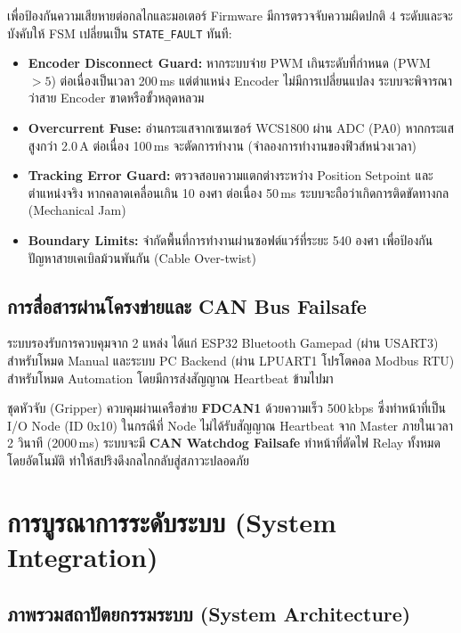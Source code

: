 เพื่อป้องกันความเสียหายต่อกลไกและมอเตอร์ Firmware มีการตรวจจับความผิดปกติ 4 ระดับและจะบังคับให้ FSM เปลี่ยนเป็น \texttt{STATE\_FAULT} ทันที:
\begin{itemize}
    \item \textbf{Encoder Disconnect Guard:} หากระบบจ่าย PWM เกินระดับที่กำหนด (PWM $> 5$) ต่อเนื่องเป็นเวลา 200\,ms แต่ตำแหน่ง Encoder ไม่มีการเปลี่ยนแปลง ระบบจะพิจารณาว่าสาย Encoder ขาดหรือขั้วหลุดหลวม
    \item \textbf{Overcurrent Fuse:} อ่านกระแสจากเซนเซอร์ WCS1800 ผ่าน ADC (PA0) หากกระแสสูงกว่า 2.0\,A ต่อเนื่อง 100\,ms จะตัดการทำงาน (จำลองการทำงานของฟิวส์หน่วงเวลา)
    \item \textbf{Tracking Error Guard:} ตรวจสอบความแตกต่างระหว่าง Position Setpoint และตำแหน่งจริง หากคลาดเคลื่อนเกิน 10 องศา ต่อเนื่อง 50\,ms ระบบจะถือว่าเกิดการติดขัดทางกล (Mechanical Jam)
    \item \textbf{Boundary Limits:} จำกัดพื้นที่การทำงานผ่านซอฟต์แวร์ที่ระยะ 540 องศา เพื่อป้องกันปัญหาสายเคเบิลม้วนพันกัน (Cable Over-twist)
\end{itemize}

\subsection{การสื่อสารผ่านโครงข่ายและ CAN Bus Failsafe}
\label{subsec:comms_canbus}

ระบบรองรับการควบคุมจาก 2 แหล่ง ได้แก่ ESP32 Bluetooth Gamepad (ผ่าน USART3) สำหรับโหมด Manual และระบบ PC Backend (ผ่าน LPUART1 โปรโตคอล Modbus RTU) สำหรับโหมด Automation โดยมีการส่งสัญญาณ Heartbeat ข้ามไปมา 

ชุดหัวจับ (Gripper) ควบคุมผ่านเครือข่าย \textbf{FDCAN1} ด้วยความเร็ว 500\,kbps ซึ่งทำหน้าที่เป็น I/O Node (ID 0x10) ในกรณีที่ Node ไม่ได้รับสัญญาณ Heartbeat จาก Master ภายในเวลา 2 วินาที (2000\,ms) ระบบจะมี \textbf{CAN Watchdog Failsafe} ทำหน้าที่ตัดไฟ Relay ทั้งหมดโดยอัตโนมัติ ทำให้สปริงดึงกลไกกลับสู่สภาวะปลอดภัย

\section{การบูรณาการระดับระบบ (System Integration)}
\label{sec:integration}

\subsection{ภาพรวมสถาปัตยกรรมระบบ (System Architecture)}
\label{subsec:system_architecture}

